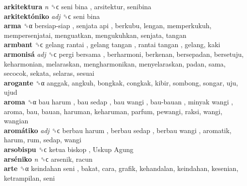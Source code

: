 \textbf{arkitektura} \emph{n}  ␝ϲ   seni bina , arsitektur, senibina  \\
\textbf{arkitektóniko} \emph{adj}  ␝ϲ   seni bina   \\
\textbf{arma} ␝α   bersiap-siap ,  senjata api , berkubu, lengan, memperkukuh, mempersenjatai, menguatkan, mengukuhkan, senjata, tangan  \\
\textbf{armbant} ␝ϲ   gelang rantai ,  gelang tangan ,  rantai tangan , gelang, kaki  \\
\textbf{armonisá} \emph{adj}  ␝ϲ   pergi bersama , berharmoni, berkenan, bersepadan, bersetuju, keharmonian, melaraskan, mengharmonikan, menyelaraskan, padan, sama, secocok, sekata, selaras, sesuai  \\
\textbf{arogante} ␝α  anggak, angkuh, bongkak, congkak, kibir, sombong, songar, uju, ujud  \\
\textbf{aroma} ␝α   bau harum ,  bau sedap ,  bau wangi ,  bau-bauan ,  minyak wangi , aroma, bau, bauan, haruman, keharuman, parfum, pewangi, raksi, wangi, wangian  \\
\textbf{aromátiko} \emph{adj}  ␝ϲ   berbau harum ,  berbau sedap ,  berbau wangi , aromatik, harum, rum, sedap, wangi  \\
\textbf{arsobispu} ␝ϲ   ketua biskop ,  Uskup Agung   \\
\textbf{arséniko} \emph{n}  ␝ϲ  arsenik, racun  \\
\textbf{arte} ␝α   keindahan seni , bakat, cara, grafik, kehandalan, keindahan, kesenian, ketrampilan, seni  \\
